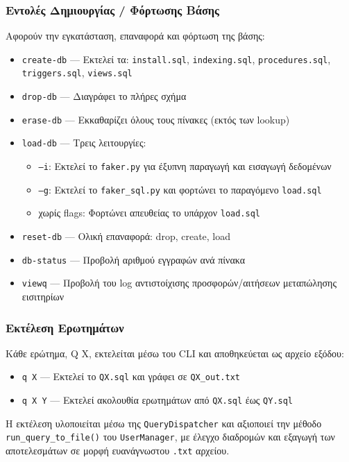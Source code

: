 \documentclass[13pt]{extarticle}
\begin{document}
\subsubsection{Εντολές Δημιουργίας / Φόρτωσης Βάσης}

Αφορούν την εγκατάσταση, επαναφορά και φόρτωση της βάσης:
\begin{itemize}
  \item \texttt{create-db} — Εκτελεί τα:
    \texttt{install.sql}, \texttt{indexing.sql}, \texttt{procedures.sql}, \texttt{triggers.sql}, \texttt{views.sql}
  \item \texttt{drop-db} — Διαγράφει το πλήρες σχήμα
  \item \texttt{erase-db} — Εκκαθαρίζει όλους τους πίνακες (εκτός των lookup)
  \item \texttt{load-db} — Τρεις λειτουργίες:
    \begin{itemize}
      \item \texttt{--i}: Εκτελεί το \texttt{faker.py} για έξυπνη παραγωγή και εισαγωγή δεδομένων
      \item \texttt{--g}: Εκτελεί το \texttt{faker\_sql.py} και φορτώνει το παραγόμενο \texttt{load.sql}
      \item χωρίς flags: Φορτώνει απευθείας το υπάρχον \texttt{load.sql}
    \end{itemize}
  \item \texttt{reset-db} — Ολική επαναφορά: drop, create, load
  \item \texttt{db-status} — Προβολή αριθμού εγγραφών ανά πίνακα
  \item \texttt{viewq} — Προβολή του log αντιστοίχισης προσφορών/αιτήσεων μεταπώλησης εισιτηρίων
\end{itemize}

\subsubsection{Εκτέλεση Ερωτημάτων}

Κάθε ερώτημα, Q X, εκτελείται μέσω του CLI και αποθηκεύεται ως αρχείο εξόδου:
\begin{itemize}
  \item \texttt{q X} — Εκτελεί το \texttt{QX.sql} και γράφει σε \texttt{QX\_out.txt}
  \item \texttt{q X Y} — Εκτελεί ακολουθία ερωτημάτων από \texttt{QX.sql} έως \texttt{QY.sql}
\end{itemize}
Η εκτέλεση υλοποιείται μέσω της \texttt{QueryDispatcher} και αξιοποιεί την μέθοδο \texttt{run\_query\_to\_file()} του \texttt{UserManager}, με έλεγχο διαδρομών και εξαγωγή των αποτελεσμάτων σε μορφή ευανάγνωστου \texttt{.txt} αρχείου.
\end{document}
